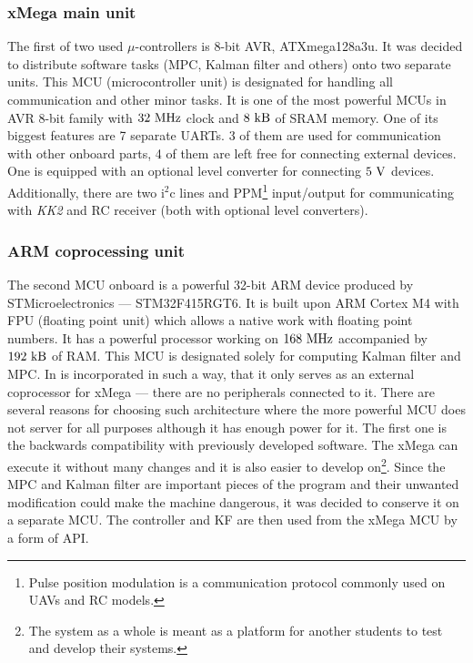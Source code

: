 \subsubsection{xMega main unit}

The first of two used $\mu$-controllers is 8-bit AVR, ATXmega128a3u. It was decided to distribute software tasks (MPC, Kalman filter and others) onto two separate units. This MCU (microcontroller unit) is designated for handling all communication and other minor tasks. It is one of the most powerful MCUs in AVR 8-bit family with $32 ~\mathrm{MHz}$ clock and $8 ~\mathrm{kB}$ of SRAM memory. One of its biggest features are 7 separate UARTs. 3 of them are used for communication with other onboard parts, 4 of them are left free for connecting external devices. One is equipped with an optional level converter for connecting $5 ~\mathrm{V}$ devices. Additionally, there are two $\mathrm{i}^2\mathrm{c}$ lines and PPM\footnote{Pulse position modulation is a communication protocol commonly used on UAVs and RC models.} input/output for communicating with \textit{KK2} and RC receiver (both with optional level converters).

\subsubsection{ARM coprocessing unit}

The second MCU onboard is a powerful 32-bit ARM device produced by STMicroelectronics --- STM32F415RGT6. It is built upon ARM Cortex M4 with FPU (floating point unit) which allows a native work with floating point numbers. It has a powerful processor working on $168 ~\mathrm{MHz}$ accompanied by $192 ~\mathrm{kB}$ of RAM. This MCU is designated solely for computing Kalman filter and MPC. In is incorporated in such a way, that it only serves as an external coprocessor for xMega --- there are no peripherals connected to it. There are several reasons for choosing such architecture where the more powerful MCU does not server for all purposes although it has enough power for it. The first one is the backwards compatibility with previously developed software. The xMega can execute it without many changes and it is also easier to develop on\footnote{The system as a whole is meant as a platform for another students to test and develop their systems.}. Since the MPC and Kalman filter are important pieces of the program and their unwanted modification could make the machine dangerous, it was decided to conserve it on a separate MCU. The controller and KF are then used from the xMega MCU by a form of API.  

